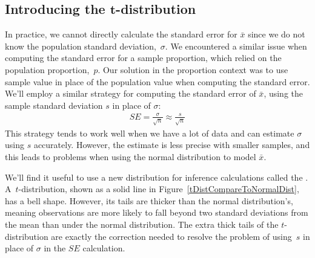 



\subsection[Introducing the $t$-distribution]
    {Introducing the $\pmb{t}$-distribution}
\label{introducingTheTDistribution}


In practice, we cannot directly calculate the standard error
for $\bar{x}$ since we do not know the population standard
deviation,~$\sigma$.
We encountered a similar issue when computing the standard
error for a sample proportion, which relied on the population
proportion,~$p$.
Our solution in the proportion context was to use sample
value in place
of the population value when computing the standard error.
We'll employ a similar strategy for computing the standard
error of $\bar{x}$, using the sample
standard deviation $s$ in place of $\sigma$:
\begin{align*}
SE = \frac{\sigma}{\sqrt{n}} \approx \frac{s}{\sqrt{n}}
\end{align*}
This strategy tends to work well when we have
a lot of data and can estimate $\sigma$ using $s$ accurately.
However, the estimate is less precise with smaller samples,
and this leads to problems when using the normal
distribution to model $\bar{x}$.

We'll find it useful to use a new distribution for
inference calculations called the
.
A~$t$-distribution, shown as a solid line in
Figure~\ref{tDistCompareToNormalDist}, has a bell shape.
However, its tails are thicker than the normal distribution's,
meaning observations are more likely to fall beyond two
standard deviations from the mean than under the normal
distribution. %
The extra thick tails of the $t$-distribution are exactly
the correction needed to resolve the problem of using~$s$
in place of $\sigma$ in the $SE$ calculation.

